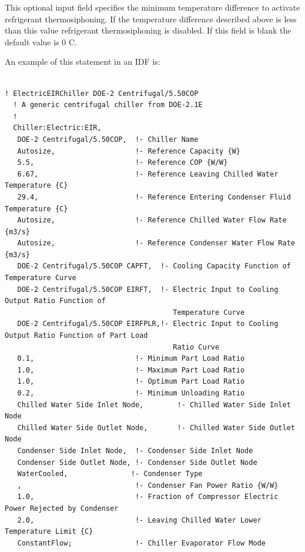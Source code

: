 This optional input field specifies the minimum temperature difference to activate refrigerant thermosiphoning. If the temperature difference described above is less than this value refrigerant thermosiphoning is disabled. If this field is blank the default value is 0 C.


An example of this statement in an IDF is:

\begin{lstlisting}

! ElectricEIRChiller DOE-2 Centrifugal/5.50COP
  ! A generic centrifugal chiller from DOE-2.1E
  !
  Chiller:Electric:EIR,
   DOE-2 Centrifugal/5.50COP,  !- Chiller Name
   Autosize,                   !- Reference Capacity {W}
   5.5,                        !- Reference COP {W/W}
   6.67,                       !- Reference Leaving Chilled Water Temperature {C}
   29.4,                       !- Reference Entering Condenser Fluid Temperature {C}
   Autosize,                   !- Reference Chilled Water Flow Rate {m3/s}
   Autosize,                   !- Reference Condenser Water Flow Rate {m3/s}
   DOE-2 Centrifugal/5.50COP CAPFT,  !- Cooling Capacity Function of Temperature Curve
   DOE-2 Centrifugal/5.50COP EIRFT,  !- Electric Input to Cooling Output Ratio Function of
                                        Temperature Curve
   DOE-2 Centrifugal/5.50COP EIRFPLR,!- Electric Input to Cooling Output Ratio Function of Part Load
                                        Ratio Curve
   0.1,                        !- Minimum Part Load Ratio
   1.0,                        !- Maximum Part Load Ratio
   1.0,                        !- Optimum Part Load Ratio
   0.2,                        !- Minimum Unloading Ratio
   Chilled Water Side Inlet Node,        !- Chilled Water Side Inlet Node
   Chilled Water Side Outlet Node,       !- Chilled Water Side Outlet Node
   Condenser Side Inlet Node,  !- Condenser Side Inlet Node
   Condenser Side Outlet Node, !- Condenser Side Outlet Node
   WaterCooled,               !- Condenser Type
   ,                           !- Condenser Fan Power Ratio {W/W}
   1.0,                        !- Fraction of Compressor Electric Power Rejected by Condenser
   2.0,                        !- Leaving Chilled Water Lower Temperature Limit {C}
   ConstantFlow;               !- Chiller Evaporator Flow Mode



\end{lstlisting}
